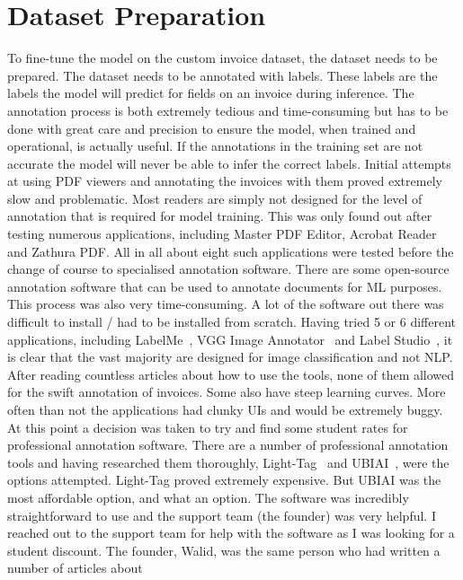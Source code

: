 \section{Dataset Preparation}
\label{sec:dataset}
To fine-tune the model on the custom invoice dataset, the dataset needs to be prepared. The dataset needs to be annotated
with labels. These labels are the labels the model will predict for fields on an invoice during inference.
\bigbreak
The annotation process is both extremely tedious and time-consuming but has to be done with great care and precision
to ensure the model, when trained and operational, is actually useful. If the annotations in the training set are not
accurate the model will never be able to infer the correct labels.
\bigbreak
Initial attempts at using PDF viewers and annotating the invoices with them proved extremely slow and problematic.
Most readers are simply not designed for the level of annotation that is required for model training. This was only
found out after testing numerous applications, including Master PDF Editor, Acrobat Reader and Zathura PDF. All in
all about eight such applications were tested before the change of course to specialised annotation software.
\bigbreak
There are some open-source annotation software that can be used to annotate documents for ML purposes. This process was
also very time-consuming. A lot of the software out there was difficult to install / had to be installed from
scratch. Having tried 5 or 6 different applications, including LabelMe~\autocite{wadaLabelmeImagePolygonal2022},
VGG Image Annotator~\autocite{duttaAnnotationSoftwareImages2019} and Label Studio~\autocite{LabelStudioOpen}, it
is clear that the vast majority are designed for image classification and not NLP. After reading countless articles
about how to use the tools, none of them allowed for the swift annotation of invoices. Some also have steep learning
curves. More often than not the applications had clunky UIs and would be extremely buggy. At this point a decision
was taken to try and find some student rates for professional annotation software.
\bigbreak
There are a number of professional annotation tools and having researched them thoroughly, Light-Tag~\autocite{LightTagTextAnnotation}
and UBIAI~\autocite{EasyUseText}, were the options attempted. Light-Tag proved extremely expensive. But UBIAI was the
most affordable option, and what an option. The software was incredibly straightforward to use and the support
team (the founder) was very helpful. I reached out to the support team for help with the software as I was
looking for a student discount. The founder, Walid, was the same person who had written a number of articles about
